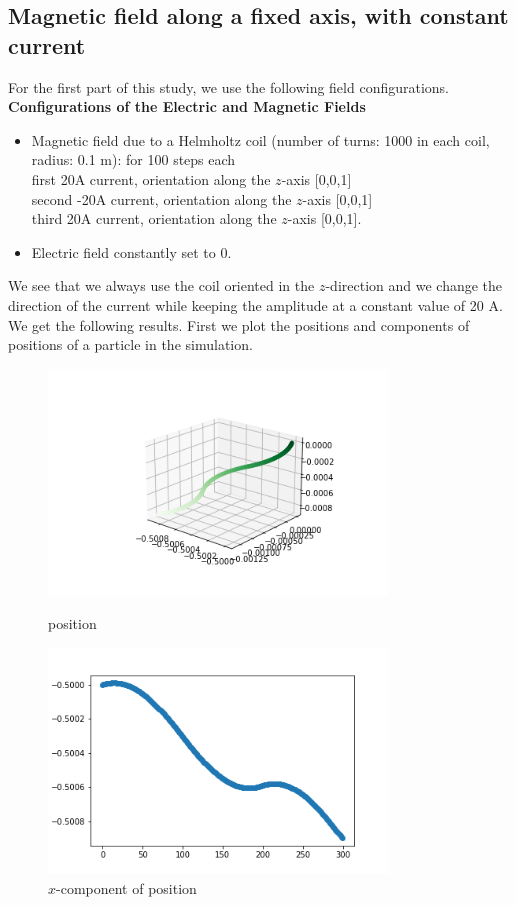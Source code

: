 \documentclass[12pt]{article}
\begin{document}
	\subsection{Magnetic field along a fixed axis, with constant current}
	For the first part of this study, we use the following field configurations.\\
	\noindent \textbf{Configurations of the Electric and Magnetic Fields}
	\begin{itemize}
		\item Magnetic field due to a Helmholtz coil (number of turns: 1000 in each coil, radius: 0.1 m): for 100  steps each \\ 
		first 20A current, orientation along
		the $z$-axis [0,0,1] \\
		second -20A current, orientation along
		the $z$-axis [0,0,1] \\
		third 20A current, orientation along
		the $z$-axis [0,0,1].
		\item Electric field constantly set to 0.
	\end{itemize}
	\noindent We see that we always use the coil oriented in the $z$-direction and we change the direction of the current while keeping the amplitude at a constant value of 20 A. We get the following results. First we plot the positions and components of positions of a particle in the simulation.
	\begin{figure}[H]
		\begin{multicols}{2}
			\includegraphics[width=\linewidth, height=6cm]{ps2Bz.png} \caption{position} \label{ps2Bz} \par
			\includegraphics[width=\linewidth, height=6cm]{psx2Bz.png} \caption{$x$-component of position} \label{psx2Bz} \par
		\end{multicols}
	\end{figure}
\end{document}
